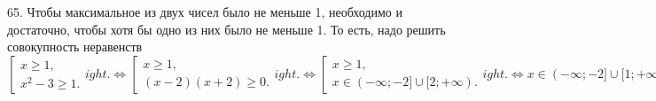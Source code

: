 65. Чтобы максимальное из двух чисел было не меньше 1, необходимо и достаточно, чтобы хотя бы одно из них было не меньше 1. То есть, надо решить совокупность неравенств\\ $\left[\begin{array}{l}x\geqslant 1,\\ x^2-3 \geqslant1 .  \end{array}
ight.\Leftrightarrow
\left[\begin{array}{l}x\geqslant 1,\\ (x-2)(x+2) \geqslant 0 .  \end{array}
ight.\Leftrightarrow
\left[\begin{array}{l}x\geqslant 1,\\ x\in (-\infty;-2]\cup[2;+\infty).  \end{array}
ight.\Leftrightarrow
x\in (-\infty;-2]\cup[1;+\infty).$\\

